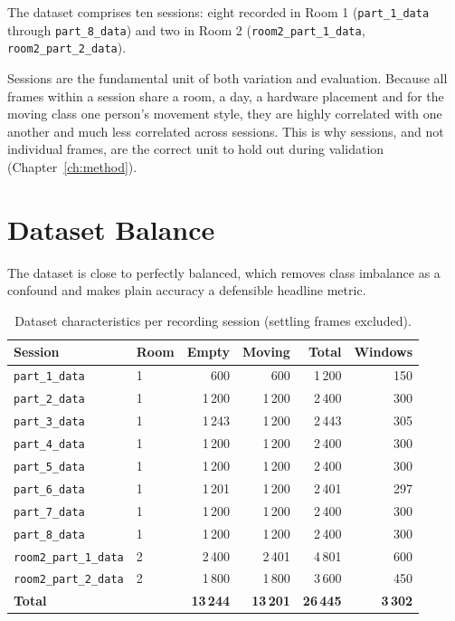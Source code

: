 \documentclass[11pt,a4paper,oneside]{report}
\newcommand{\code}[1]{\texttt{\small #1}}
\begin{document}
The dataset comprises ten sessions: eight recorded in Room 1
(\code{part\_1\_data} through \code{part\_8\_data}) and two in Room 2
(\code{room2\_part\_1\_data}, \code{room2\_part\_2\_data}).

Sessions are the fundamental unit of both variation and evaluation. Because all
frames within a session share a room, a day, a hardware placement and for
the moving class one person's movement style, they are highly correlated
with one another and much less correlated across sessions. This is why
sessions, and not individual frames, are the correct unit to hold out during
validation (Chapter~\ref{ch:method}).

\section{Dataset Balance}

The dataset is close to perfectly balanced, which removes class imbalance as a
confound and makes plain accuracy a defensible headline metric.

\begin{table}[H]
\centering
\caption{Dataset characteristics per recording session (settling frames excluded).}
\label{tab:dataset}
\begin{tabular}{@{}llrrrr@{}}
\toprule
\textbf{Session} & \textbf{Room} & \textbf{Empty} & \textbf{Moving} &
\textbf{Total} & \textbf{Windows} \\
\midrule
\code{part\_1\_data}        & 1 & 600    & 600    & 1\,200 & 150 \\
\code{part\_2\_data}        & 1 & 1\,200 & 1\,200 & 2\,400 & 300 \\
\code{part\_3\_data}        & 1 & 1\,243 & 1\,200 & 2\,443 & 305 \\
\code{part\_4\_data}        & 1 & 1\,200 & 1\,200 & 2\,400 & 300 \\
\code{part\_5\_data}        & 1 & 1\,200 & 1\,200 & 2\,400 & 300 \\
\code{part\_6\_data}        & 1 & 1\,201 & 1\,200 & 2\,401 & 297 \\
\code{part\_7\_data}        & 1 & 1\,200 & 1\,200 & 2\,400 & 300 \\
\code{part\_8\_data}        & 1 & 1\,200 & 1\,200 & 2\,400 & 300 \\
\code{room2\_part\_1\_data} & 2 & 2\,400 & 2\,401 & 4\,801 & 600 \\
\code{room2\_part\_2\_data} & 2 & 1\,800 & 1\,800 & 3\,600 & 450 \\
\midrule
\textbf{Total}              &   & \textbf{13\,244} & \textbf{13\,201} &
\textbf{26\,445} & \textbf{3\,302} \\
\bottomrule
\end{tabular}
\end{table}
\end{document}
